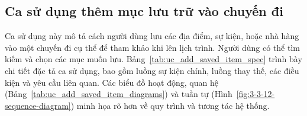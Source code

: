 \subsection{Ca sử dụng thêm mục lưu trữ vào chuyến đi}
\noindent Ca sử dụng này mô tả cách người dùng lưu các địa điểm, sự kiện, hoặc nhà hàng vào một chuyến đi cụ thể để tham khảo khi lên lịch trình. Người dùng có thể tìm kiếm và chọn các mục muốn lưu. Bảng~\ref{tab:uc_add_saved_item_spec} trình bày chi tiết đặc tả ca sử dụng, bao gồm luồng sự kiện chính, luồng thay thế, các điều kiện và yêu cầu liên quan. Các biểu đồ hoạt động, quan hệ (Bảng~\ref{tab:uc_add_saved_item_diagrams}) và tuần tự (Hình~\ref{fig:3-3-12-sequence-diagram}) minh họa rõ hơn về quy trình và tương tác hệ thống.

